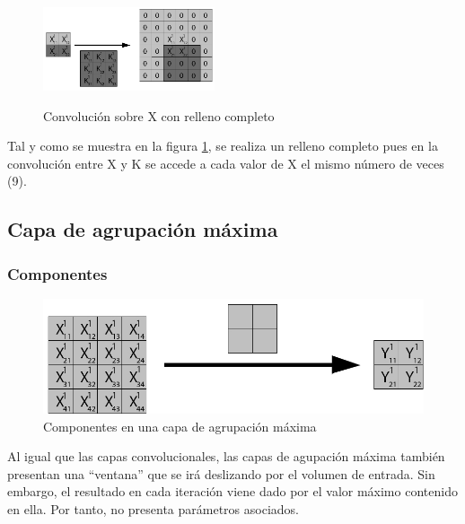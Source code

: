 \begin{figure}[H]
{		\includegraphics[width=0.45\textwidth]{imagenes/conv_padding_15.jpg}%
		\label{fig:sub15}%
	}\hfill
	\\
	
	\caption{Convolución sobre X con relleno completo}
	\label{fig:full_padding}
\end{figure}

Tal y como se muestra en la figura \ref{fig:full_padding}, se realiza un relleno completo pues en la convolución entre X y K se accede a cada valor de X el mismo número de veces (9).

\subsection{Capa de agrupación máxima}

\subsubsection{Componentes}

\begin{figure}[H]
	\centering
	\includegraphics[scale=0.35]{imagenes/pool_nombres.jpg}  
	\caption{Componentes en una capa de agrupación máxima}
\end{figure}

Al igual que las capas convolucionales, las capas de agupación máxima también presentan una ``ventana'' que se irá deslizando por el volumen de entrada. Sin embargo, el resultado en cada iteración viene dado por el valor máximo contenido en ella. Por tanto, no presenta parámetros asociados.

